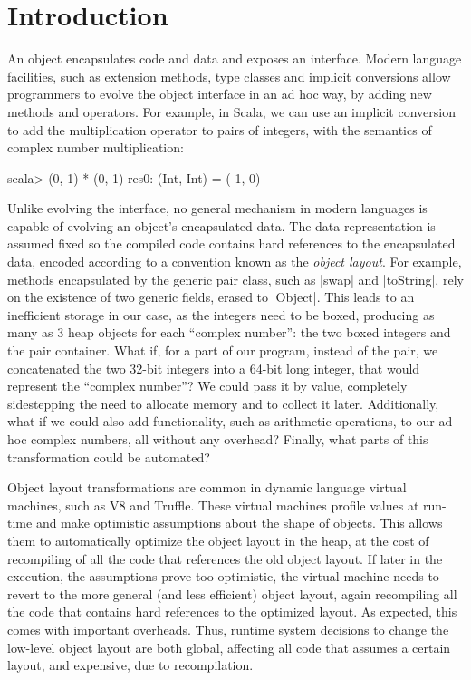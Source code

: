 \section{Introduction}
\label{sec:intro}

An object encapsulates code and data and exposes an interface. Modern
language facilities, such as extension methods, type classes and
implicit conversions allow programmers to evolve the object interface
in an ad hoc way, by adding new methods and operators. For example, in
Scala, we can use an implicit conversion to add the multiplication
operator to pairs of integers, with the semantics of complex number
multiplication:

\begin{lstlisting-nobreak}
scala> (0, 1) * (0, 1)
res0: (Int, Int) = (-1, 0)
\end{lstlisting-nobreak}

Unlike evolving the interface, no general mechanism in modern
languages is capable of evolving an object's encapsulated data. The
data representation is assumed fixed so the compiled code contains hard
references to the encapsulated data, encoded according to a convention
known as the \emph{object layout}. For example, methods encapsulated
by the generic pair class, such as |swap| and |toString|, rely on the
existence of two generic fields, erased to |Object|. This leads to
an inefficient storage in our case, as the integers need to be boxed, producing as many as
3 heap objects for each ``complex number'': the two boxed integers and
the pair container. What if, for a part of  our program, instead of the pair, we
concatenated the two 32-bit integers into a 64-bit long integer, that
would represent the ``complex number''? We could pass it by value,
completely sidestepping the need to allocate memory and to collect it
later. Additionally, what if we could also add
functionality, such as arithmetic operations, to our ad hoc complex
numbers, all without any overhead? Finally, what parts of this
transformation could be automated? %

Object layout transformations are common in dynamic language virtual
machines, such as V8 and Truffle. These virtual machines profile
values at run-time and make optimistic assumptions about the shape of
objects. This allows them to automatically optimize the object layout
in the heap, at the cost of recompiling of all the code that references
 the old object layout.
If later in the execution, the assumptions prove too optimistic, the
virtual machine needs to revert to the more general (and less
efficient) object layout, again recompiling all the code that contains
hard references to the optimized layout. As expected, this comes with
important overheads. Thus, runtime system decisions to change the
low-level object layout are both global, affecting all code that
assumes a certain layout, and expensive, due to recompilation.

